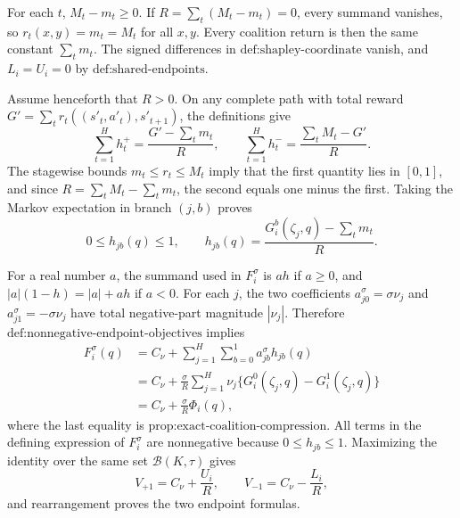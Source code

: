 For each \(t\), \(M_t-m_t\ge0\).  If \(R=\sum_t(M_t-m_t)=0\), every summand vanishes, so \(r_t(x,y)=m_t=M_t\) for all \(x,y\).  Every coalition return is then the same constant \(\sum_tm_t\).  The signed differences in \(\text{def:shapley-coordinate}\) vanish, and \(L_i=U_i=0\) by \(\text{def:shared-endpoints}\).

Assume henceforth that \(R>0\).  On any complete path with total reward \(G'=\sum_tr_t((s'_t,a'_t),s'_{t+1})\), the definitions give
\[
 \sum_{t=1}^Hh_t^+=\frac{G'-\sum_tm_t}{R},\qquad
 \sum_{t=1}^Hh_t^-=\frac{\sum_tM_t-G'}{R}.
\]
The stagewise bounds \(m_t\le r_t\le M_t\) imply that the first quantity lies in \([0,1]\), and since \(R=\sum_tM_t-\sum_tm_t\), the second equals one minus the first.  Taking the Markov expectation in branch \((j,b)\) proves
\[
 0\le h_{jb}(q)\le1,
 \qquad
 h_{jb}(q)=\frac{G_i^b(\zeta_j,q)-\sum_tm_t}{R}.
\]

For a real number \(a\), the summand used in \(F_i^\sigma\) is \(ah\) if \(a\ge0\), and \(|a|(1-h)=|a|+ah\) if \(a<0\).  For each \(j\), the two coefficients \(a_{j0}^\sigma=\sigma\nu_j\) and \(a_{j1}^\sigma=-\sigma\nu_j\) have total negative-part magnitude \(|\nu_j|\).  Therefore \(\text{def:nonnegative-endpoint-objectives}\) implies
\[
\begin{aligned}
 F_i^\sigma(q)
 &=C_\nu+\sum_{j=1}^H\sum_{b=0}^1a_{jb}^\sigma h_{jb}(q)\\
 &=C_\nu+\frac{\sigma}{R}\sum_{j=1}^H\nu_j
       \{G_i^0(\zeta_j,q)-G_i^1(\zeta_j,q)\}\\
 &=C_\nu+\frac{\sigma}{R}\Phi_i(q),
\end{aligned}
\]
where the last equality is \(\text{prop:exact-coalition-compression}\).  All terms in the defining expression of \(F_i^\sigma\) are nonnegative because \(0\le h_{jb}\le1\).  Maximizing the identity over the same set \(\mathcal B(K,\tau)\) gives
\[
 V_{+1}=C_\nu+\frac{U_i}{R},\qquad
 V_{-1}=C_\nu-\frac{L_i}{R},
\]
and rearrangement proves the two endpoint formulas.